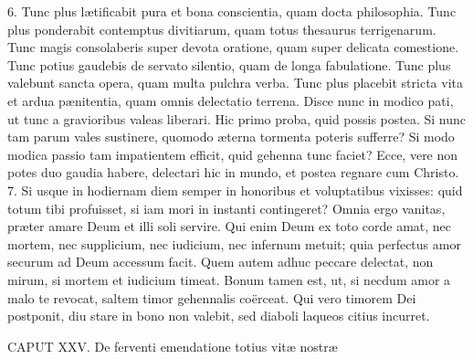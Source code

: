 6. Tunc plus lætificabit pura et bona conscientia, quam docta philosophia. Tunc plus ponderabit contemptus divitiarum, quam totus thesaurus terrigenarum. Tunc magis consolaberis super devota oratione, quam super delicata comestione. Tunc potius gaudebis de servato silentio, quam de longa fabulatione. Tunc plus valebunt sancta opera, quam multa pulchra verba. Tunc plus placebit stricta vita et ardua pænitentia, quam omnis delectatio terrena. Disce nunc in modico pati, ut tunc a gravioribus valeas liberari. Hic primo proba, quid possis postea. Si nunc tam parum vales sustinere, quomodo æterna tormenta poteris sufferre? Si modo modica passio tam impatientem efficit, quid gehenna tunc faciet? Ecce, vere non potes duo gaudia habere, delectari hic in mundo, et postea regnare cum Christo.
7. Si usque in hodiernam diem semper in honoribus et voluptatibus vixisses: quid totum tibi profuisset, si iam mori in instanti contingeret? Omnia ergo vanitas, præter amare Deum et illi soli servire. Qui enim Deum ex toto corde amat, nec mortem, nec supplicium, nec iudicium, nec infernum metuit; quia perfectus amor securum ad Deum accessum facit. Quem autem adhuc peccare delectat, non mirum, si mortem et iudicium timeat. Bonum tamen est, ut, si necdum amor a malo te revocat, saltem timor gehennalis coërceat. Qui vero timorem Dei postponit, diu stare in bono non valebit, sed diaboli laqueos citius incurret.


CAPUT XXV.
De ferventi emendatione totius vitæ nostræ

